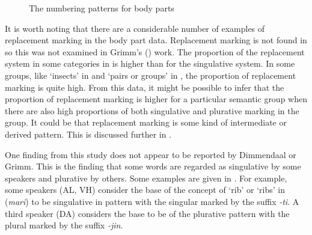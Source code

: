 \documentclass[output=paper]{langsci/langscibook}
\begin{document}
\begin{figure}
\caption{The numbering patterns for body parts}
\label{fig:moodie:2}
\end{figure}

It is worth noting that there are a considerable number of examples of replacement marking in the body part data. Replacement marking is not found in  so this was not examined in Grimm’s (\citeyear{Grimm2012}) work. The proportion of the replacement system in some categories in  is higher than for the singulative system.  In some groups, like ‘insects’ in  and  ‘pairs or groups’ in , the proportion of replacement marking is quite high. From this data, it might be possible to infer that the proportion of replacement marking is higher for a particular semantic group when there are also high proportions of both singulative and plurative marking in the group. It could be that replacement marking is some kind of intermediate or derived pattern.  This is discussed further in .

One finding from this study does not appear to be reported by Dimmendaal or Grimm. This is the finding that some words are regarded as singulative by some speakers and plurative by others. Some examples are given in . For example, some speakers (AL, VH) consider the base of the concept of ‘rib’ or ‘ribs’ in  (\textit{mari}) to be singulative in pattern with the singular marked by the suffix \textit{-ti}. A third speaker (DA) considers the base to be of the plurative pattern with the plural marked by the suffix \textit{-jin}. 
\end{document}
